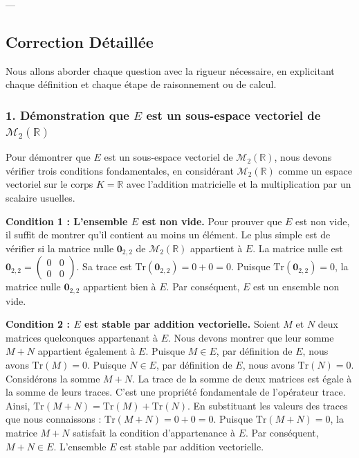 \documentclass{report}
\begin{document}
---

\subsection*{Correction Détaillée}

Nous allons aborder chaque question avec la rigueur nécessaire, en explicitant chaque définition et chaque étape de raisonnement ou de calcul.

\subsubsection*{1. Démonstration que $E$ est un sous-espace vectoriel de $\mathcal{M}_2(\mathbb{R})$}

Pour démontrer que $E$ est un sous-espace vectoriel de $\mathcal{M}_2(\mathbb{R})$, nous devons vérifier trois conditions fondamentales, en considérant $\mathcal{M}_2(\mathbb{R})$ comme un espace vectoriel sur le corps $K = \mathbb{R}$ avec l'addition matricielle et la multiplication par un scalaire usuelles.

\textbf{Condition 1 : L'ensemble $E$ est non vide.}
Pour prouver que $E$ est non vide, il suffit de montrer qu'il contient au moins un élément. Le plus simple est de vérifier si la matrice nulle $\mathbf{0}_{2,2}$ de $\mathcal{M}_2(\mathbb{R})$ appartient à $E$.
La matrice nulle est $\mathbf{0}_{2,2} = \begin{pmatrix} 0 & 0 \\ 0 & 0 \end{pmatrix}$.
Sa trace est $\text{Tr}(\mathbf{0}_{2,2}) = 0+0 = 0$.
Puisque $\text{Tr}(\mathbf{0}_{2,2}) = 0$, la matrice nulle $\mathbf{0}_{2,2}$ appartient bien à $E$.
Par conséquent, $E$ est un ensemble non vide.

\textbf{Condition 2 : $E$ est stable par addition vectorielle.}
Soient $M$ et $N$ deux matrices quelconques appartenant à $E$. Nous devons montrer que leur somme $M+N$ appartient également à $E$.
Puisque $M \in E$, par définition de $E$, nous avons $\text{Tr}(M) = 0$.
Puisque $N \in E$, par définition de $E$, nous avons $\text{Tr}(N) = 0$.
Considérons la somme $M+N$. La trace de la somme de deux matrices est égale à la somme de leurs traces. C'est une propriété fondamentale de l'opérateur trace.
Ainsi, $\text{Tr}(M+N) = \text{Tr}(M) + \text{Tr}(N)$.
En substituant les valeurs des traces que nous connaissons :
$\text{Tr}(M+N) = 0 + 0 = 0$.
Puisque $\text{Tr}(M+N) = 0$, la matrice $M+N$ satisfait la condition d'appartenance à $E$.
Par conséquent, $M+N \in E$. L'ensemble $E$ est stable par addition vectorielle.
\end{document}
